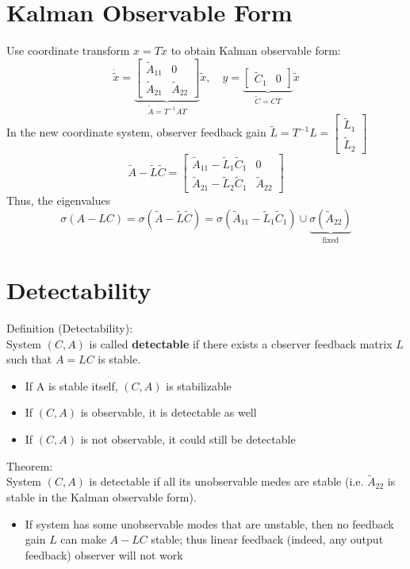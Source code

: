 \documentclass[10pt,a4paper,oneside]{article}
\begin{document}
\section{Kalman Observable Form}
Use coordinate transform $x=T \tilde{x}$ to obtain Kalman observable form:
\[
\dot{\tilde{x}}=\underbrace{\left[\begin{array}{cc}{\tilde{A}_{11}} & {0} \\ {\tilde{A}_{21}} & {\tilde{A}_{22}}\end{array}\right]}_{\tilde{A}=T^{-1} A T} \tilde{x}, \quad y=\underbrace{\left[\begin{array}{cc}{\tilde{C}_{1}} & {0}\end{array}\right]}_{\tilde{C}=CT} \tilde{x}
\]
In the new coordinate system, observer feedback gain $\tilde{L}=T^{-1} L=\left[\begin{array}{c}{\tilde{L}_{1}} \\ {\tilde{L}_{2}}\end{array}\right]$
\[
\tilde{A}-\tilde{L} \tilde{C}=\left[\begin{array}{ll}{\tilde{A}_{11}-\tilde{L}_{1} \tilde{C}_{1}} & {0} \\ {\tilde{A}_{21}-\tilde{L}_{2} \tilde{C}_{1}} & {\tilde{A}_{22}}\end{array}\right]
\]
Thus, the eigenvalues
\[
\sigma(A-L C)=\sigma(\tilde{A}-\tilde{L} \tilde{C})=\sigma\left(\tilde{A}_{11}-\tilde{L}_{1} \tilde{C}_{1}\right) \cup \underbrace{\sigma\left(\tilde{A}_{22}\right)}_{\text { fixed }}
\]
\section{Detectability}
Definition (Detectability):\\
System $(C, A)$ is called {\bfseries detectable} if there exists a cbserver feedback
matrix $L$ such that $A=LC$ is stable.\\
\begin{itemize}
\item If A is stable itself, $(C, A)$ is stabilizable
\item If $(C, A)$ is observable, it is detectable as well
\item If $(C, A)$ is not observable, it could still be detectable
\end{itemize}
Theorem:\\
System $(C, A)$ is detectable if all its unobservable medes are stable (i.e. $\tilde{A}_{22}$ is stable in the Kalman observable form).
\begin{itemize}
\item If system has some unobservable modes that are unstable, then no
feedback gain $L$ can make $A-L C$ stable; thus linear feedback
(indeed, any output feedback) observer will not work
\end{itemize}
\end{document}
